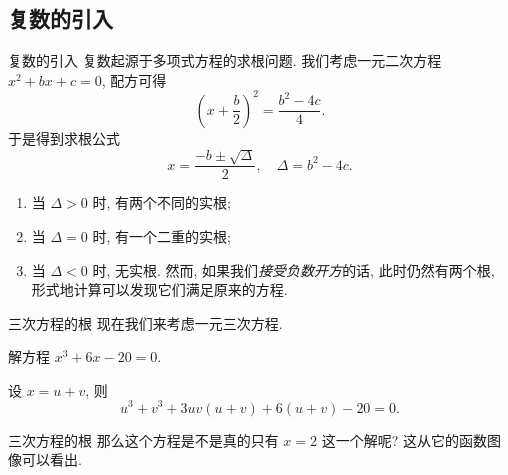\subsection{复数的引入}

\begin{frame}{复数的引入\noexer}
	\onslide<+->复数起源于多项式方程的求根问题.
	\onslide<+->我们考虑一元二次方程 $x^2+bx+c=0$,
	\onslide<+->配方可得
		\[\left(x+\frac b2\right)^2=\frac{b^2-4c}4.\]
	\onslide<+->于是得到求根公式
		\[x=\frac{-b\pm\sqrt\Delta}2,\quad \Delta=b^2-4c.\]
	\begin{enumerate}
		\item 当 $\Delta>0$ 时, 有两个不同的实根;
		\item 当 $\Delta=0$ 时, 有一个二重的实根;
		\item 当 $\Delta<0$ 时, 无实根.
	\onslide<+->然而, 如果我们\emph{接受负数开方}的话, 此时仍然有两个根, 形式地计算可以发现它们满足原来的方程.
	\end{enumerate}
\end{frame}

\begin{frame}{三次方程的根\noexer}
	\onslide<+->现在我们来考虑一元三次方程.

	\onslide<+->
	\begin{example}
		解方程 $x^3+6x-20=0$.
	\end{example}

	\onslide<+->
	\begin{solution}
		设 $x=u+v$, 则
			\[u^3+v^3+3uv(u+v)+6(u+v)-20=0.\]
		\vspace{-2\baselineskip}
		\onslide<+->{
			\begin{flalign*}
				&\text{所以}&u=1\pm\sqrt3,\quad v=1\mp\sqrt 3,
				\qquad\onslide<+->{x=u+v=2.}&&&\phantom{\text{所以}}
			\end{flalign*}}
		\vspace{-1.4\baselineskip}
	\end{solution}
\end{frame}


\begin{frame}{三次方程的根\noexer}
	\onslide<+->
	那么这个方程是不是真的只有 $x=2$ 这一个解呢?
	\onslide<+->
	这从它的函数图像可以看出.
	\begin{center}
	\end{center}
\end{frame}


